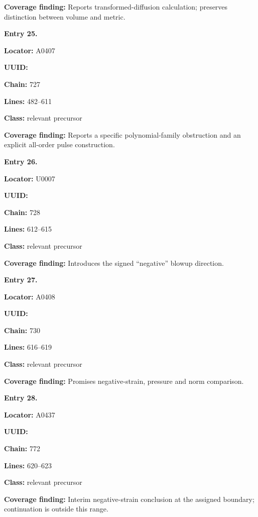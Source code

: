 \textbf{Coverage finding:} Reports transformed-diffusion calculation;
preserves distinction between volume and metric.


\textbf{Entry 25.}

\textbf{Locator:} A0407

\textbf{UUID:} \protect{}

\textbf{Chain:} 727

\textbf{Lines:} 482--611

\textbf{Class:} relevant precursor

\textbf{Coverage finding:} Reports a specific polynomial-family
obstruction and an explicit all-order pulse construction.


\textbf{Entry 26.}

\textbf{Locator:} U0007

\textbf{UUID:} \protect{}

\textbf{Chain:} 728

\textbf{Lines:} 612--615

\textbf{Class:} relevant precursor

\textbf{Coverage finding:} Introduces the signed ``negative'' blowup
direction.


\textbf{Entry 27.}

\textbf{Locator:} A0408

\textbf{UUID:} \protect{}

\textbf{Chain:} 730

\textbf{Lines:} 616--619

\textbf{Class:} relevant precursor

\textbf{Coverage finding:} Promises negative-strain, pressure and norm
comparison.


\textbf{Entry 28.}

\textbf{Locator:} A0437

\textbf{UUID:} \protect{}

\textbf{Chain:} 772

\textbf{Lines:} 620--623

\textbf{Class:} relevant precursor

\textbf{Coverage finding:} Interim negative-strain conclusion at the
assigned boundary; continuation is outside this range.


